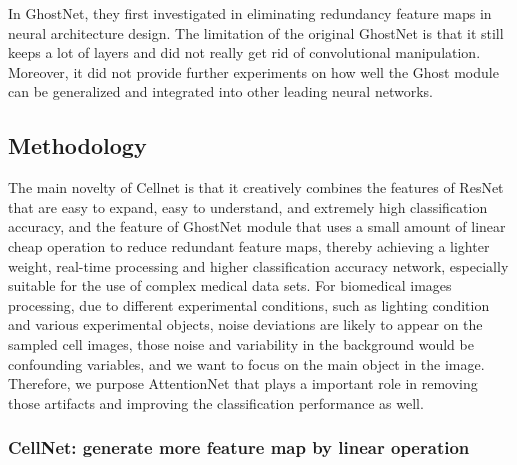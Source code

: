 In GhostNet\cite{19}, they first investigated in eliminating redundancy feature maps in neural architecture design. The limitation of the original GhostNet \cite{19} is that it still keeps a lot of layers and did not really get rid of convolutional manipulation. Moreover, it did not provide further experiments on how well the Ghost module can be generalized and integrated into other leading neural networks.

\subsection{Methodology}
The main novelty of Cellnet is that it creatively combines the features of ResNet\cite{20} that are easy to expand, easy to understand, and extremely high classification accuracy, and the feature of GhostNet\cite{19} module that uses a small amount of linear cheap operation to reduce  redundant feature maps, thereby achieving a lighter weight, real-time processing and higher classification accuracy network, especially suitable for the use of complex medical data sets.
For biomedical images processing, due to different experimental conditions, such as lighting condition and various  experimental objects, noise deviations are likely to appear on the sampled cell images\cite{6}\cite{7}, those noise and variability in the background would be confounding variables, and we want to focus on the main object in the image. Therefore, we purpose AttentionNet that plays a important role in removing those artifacts and improving the  classification performance as well.

\subsubsection{CellNet: generate more feature map by linear operation}

